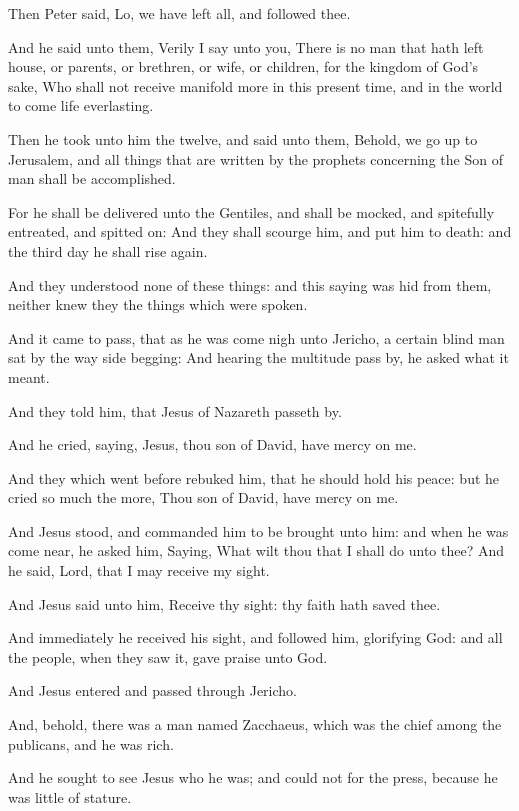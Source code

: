 \Verse Then Peter said, Lo, we have left all, and followed thee.

\Verse And he said unto them, Verily I say unto you, There is no man that hath left house, or parents, or brethren, or wife, or children, for the kingdom of God's sake, \Verse Who shall not receive manifold more in this present time, and in the world to come life everlasting.

\Verse Then he took unto him the twelve, and said unto them, Behold, we go up to Jerusalem, and all things that are written by the prophets concerning the Son of man shall be accomplished.

\Verse For he shall be delivered unto the Gentiles, and shall be mocked, and spitefully entreated, and spitted on: \Verse And they shall scourge him, and put him to death: and the third day he shall rise again.

\Verse And they understood none of these things: and this saying was hid from them, neither knew they the things which were spoken.

\Verse And it came to pass, that as he was come nigh unto Jericho, a certain blind man sat by the way side begging: \Verse And hearing the multitude pass by, he asked what it meant.

\Verse And they told him, that Jesus of Nazareth passeth by.

\Verse And he cried, saying, Jesus, thou son of David, have mercy on me.

\Verse And they which went before rebuked him, that he should hold his peace: but he cried so much the more, Thou son of David, have mercy on me.

\Verse And Jesus stood, and commanded him to be brought unto him: and when he was come near, he asked him, \Verse Saying, What wilt thou that I shall do unto thee? And he said, Lord, that I may receive my sight.

\Verse And Jesus said unto him, Receive thy sight: thy faith hath saved thee.

\Verse And immediately he received his sight, and followed him, glorifying God: and all the people, when they saw it, gave praise unto God.


\Chapter
\Verse And Jesus entered and passed through Jericho.

\Verse And, behold, there was a man named Zacchaeus, which was the chief among the publicans, and he was rich.

\Verse And he sought to see Jesus who he was; and could not for the press, because he was little of stature.

